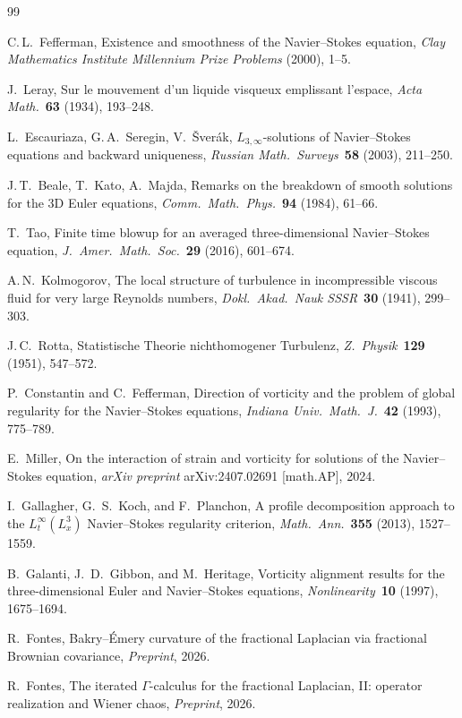\documentclass[11pt]{article}
\theoremstyle{definition}
\begin{document}
\begin{thebibliography}{99}

C.\,L.~Fefferman,
Existence and smoothness of the Navier--Stokes equation,
\emph{Clay Mathematics Institute Millennium Prize Problems}
(2000), 1--5.

J.~Leray,
Sur le mouvement d'un liquide visqueux emplissant l'espace,
\emph{Acta Math.}~\textbf{63} (1934), 193--248.

L.~Escauriaza, G.\,A.~Seregin, V.~\v{S}ver\'ak,
$L_{3,\infty}$-solutions of Navier--Stokes equations and backward
uniqueness, \emph{Russian Math.\ Surveys}~\textbf{58} (2003),
211--250.

J.\,T.~Beale, T.~Kato, A.~Majda,
Remarks on the breakdown of smooth solutions for the 3D Euler
equations, \emph{Comm.\ Math.\ Phys.}~\textbf{94} (1984), 61--66.

T.~Tao,
Finite time blowup for an averaged three-dimensional
Navier--Stokes equation,
\emph{J.\ Amer.\ Math.\ Soc.}~\textbf{29} (2016), 601--674.

A.\,N.~Kolmogorov,
The local structure of turbulence in incompressible viscous fluid
for very large Reynolds numbers,
\emph{Dokl.\ Akad.\ Nauk SSSR}~\textbf{30} (1941), 299--303.

J.\,C.~Rotta,
Statistische Theorie nichthomogener Turbulenz,
\emph{Z.\ Physik}~\textbf{129} (1951), 547--572.

P.~Constantin and C.~Fefferman,
Direction of vorticity and the problem of global
regularity for the Navier--Stokes equations,
\emph{Indiana Univ.\ Math.\ J.}~\textbf{42} (1993),
775--789.

E.~Miller,
On the interaction of strain and vorticity for
solutions of the Navier--Stokes equation,
\emph{arXiv preprint} arXiv:2407.02691 [math.AP], 2024.

I.~Gallagher, G.~S.~Koch, and F.~Planchon,
A profile decomposition approach to the
$L^\infty_t(L^3_x)$ Navier--Stokes regularity
criterion,
\emph{Math.\ Ann.}~\textbf{355} (2013), 1527--1559.

B.~Galanti, J.~D.~Gibbon, and M.~Heritage,
Vorticity alignment results for the three-dimensional
Euler and Navier--Stokes equations,
\emph{Nonlinearity}~\textbf{10} (1997), 1675--1694.

R.~Fontes,
Bakry--\'Emery curvature of the fractional Laplacian
via fractional Brownian covariance,
\emph{Preprint}, 2026.

R.~Fontes,
The iterated $\Gamma$-calculus for the fractional
Laplacian, II: operator realization and Wiener chaos,
\emph{Preprint}, 2026.

\end{thebibliography}
\end{document}
